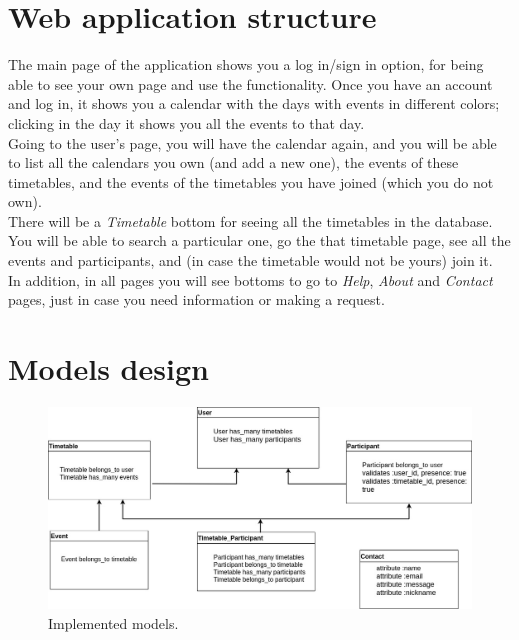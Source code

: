 \section{Web application structure}
\vspace{-5mm}
The main page of the application shows you a log in/sign in option, for being able to see your own page and use the functionality. Once you have an account and log in, it shows you a calendar with the days with events in different colors; clicking in the day it shows you all the events to that day.\\
Going to the user's page, you will have the calendar again, and you will be able to list all the calendars you own (and add a new one), the events of these timetables, and the events of the timetables you have joined (which you do not own).\\
There will be a \textit{Timetable} bottom for seeing all the timetables in the database. You will be able to search a particular one, go the that timetable page, see all the events and participants, and (in case the timetable would not be yours) join it.\\
In addition, in all pages you will see bottoms to go to \textit{Help}, \textit{About} and \textit{Contact} pages, just in case you need information or making a request.

\newpage

\section{Models design}
\vspace{-5mm}
\begin{figure}[H]
	\centering
    \includegraphics[trim={0 0 0 0},clip,width=1\textwidth]{Files/Models.jpg}
    \caption{Implemented models.\cite{draw:io}}
    \label{fig: Models}
\end{figure}

